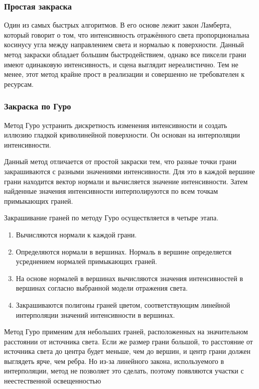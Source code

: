 \subsubsection{Простая закраска}
Один из самых быстрых алгоритмов.
В его основе лежит закон Ламберта, который говорит о том, что интенсивность отражённого света пропорциональна косинусу угла между направлением света и нормалью к поверхности.
Данный метод закраски обладает большим быстродействием, однако все пиксели грани имеют одинаковую интенсивность, и сцена выглядит нереалистично. 
Тем не менее, этот метод крайне прост в реализации и совершенно не требователен к ресурсам.

\subsubsection{Закраска по Гуро}

Метод Гуро устранить дискретность изменения интенсивности и создать иллюзию гладкой криволинейной поверхности.
Он основан на интерполяции интенсивности.

Данный метод отличается от простой закраски тем, что разные точки грани закрашиваются с разными значениями интенсивности.
Для это в каждой вершине грани находится вектор нормали и вычисляется значение интенсивности.
Затем найденные значения интенсивности интерполируются по всем точкам примыкающих граней.

Закрашивание граней по методу Гуро осуществляется в четыре этапа.
\begin{enumerate}
	\item Вычисляются нормали к каждой грани.
	\item Определяются нормали в вершинах. Нормаль в вершине определяется усреднением нормалей примыкающих граней.
	\item На основе нормалей в вершинах вычисляются значения интенсивностей в вершинах согласно выбранной модели отражения света.
	\item Закрашиваются полигоны граней цветом, соответствующим линейной интерполяции значений интенсивности в вершинах.
\end{enumerate}

Метод Гуро применим для небольших граней, расположенных на значительном расстоянии от источника света. Если же размер грани большой, то расстояние от источника света до центра будет меньше, чем до вершин, и центр грани должен выглядеть ярче, чем ребра. 
Но из-за линейного закона, используемого в интерполяции, метод не позволяет это сделать, поэтому появляются участки с неестественной освещенностью

